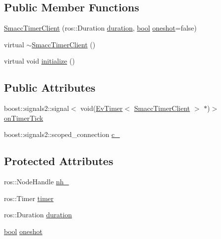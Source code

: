 \subsection*{Public Member Functions}
\begin{DoxyCompactItemize}
\item 
\hyperlink{classsmacc_1_1SmaccTimerClient_af67967bbebf935ab0075a4b0ee105c79}{Smacc\+Timer\+Client} (ros\+::\+Duration \hyperlink{classsmacc_1_1SmaccTimerClient_ab84934012c030051e489b788954ad009}{duration}, \hyperlink{classbool}{bool} \hyperlink{classsmacc_1_1SmaccTimerClient_a98a72d40852bc26f1b327fe507a69cd9}{oneshot}=false)
\item 
virtual \hyperlink{classsmacc_1_1SmaccTimerClient_a6da0cd493e8b6f7ed978a9abef2786fd}{$\sim$\+Smacc\+Timer\+Client} ()
\item 
virtual void \hyperlink{classsmacc_1_1SmaccTimerClient_aa158c13a736a85637f97b6dfde09e0bb}{initialize} ()
\end{DoxyCompactItemize}
\subsection*{Public Attributes}
\begin{DoxyCompactItemize}
\item 
boost\+::signals2\+::signal$<$ void(\hyperlink{structsmacc_1_1EvTimer}{Ev\+Timer}$<$ \hyperlink{classsmacc_1_1SmaccTimerClient}{Smacc\+Timer\+Client} $>$ $\ast$)$>$ \hyperlink{classsmacc_1_1SmaccTimerClient_a956acd3689ff143d52066fddc884072f}{on\+Timer\+Tick}
\item 
boost\+::signals2\+::scoped\+\_\+connection \hyperlink{classsmacc_1_1SmaccTimerClient_ae86e47b05d8748ce801ef3fc2b4c69ed}{c\+\_\+}
\end{DoxyCompactItemize}
\subsection*{Protected Attributes}
\begin{DoxyCompactItemize}
\item 
ros\+::\+Node\+Handle \hyperlink{classsmacc_1_1SmaccTimerClient_a0e6cc9e347055c1095d664591b59b198}{nh\+\_\+}
\item 
ros\+::\+Timer \hyperlink{classsmacc_1_1SmaccTimerClient_a52ba673d608237fdc159968c9be64547}{timer}
\item 
ros\+::\+Duration \hyperlink{classsmacc_1_1SmaccTimerClient_ab84934012c030051e489b788954ad009}{duration}
\item 
\hyperlink{classbool}{bool} \hyperlink{classsmacc_1_1SmaccTimerClient_a98a72d40852bc26f1b327fe507a69cd9}{oneshot}
\end{DoxyCompactItemize}
